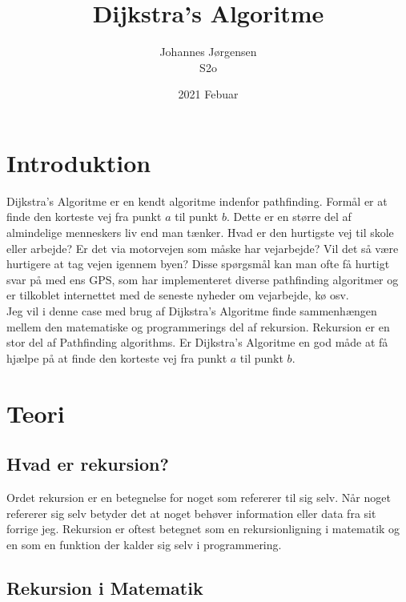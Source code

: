 \documentclass[12pt]{article}
\begin{document}
\title{Dijkstra's Algoritme}
\author{Johannes Jørgensen\\ S2o}
\date{2021 Febuar}
\maketitle
\pagebreak
\tableofcontents
\pagebreak

\section{Introduktion}
Dijkstra's Algoritme er en kendt algoritme indenfor pathfinding. Formål er at finde den korteste vej fra punkt $a$ til punkt $b$. Dette er en større del af almindelige menneskers liv end man tænker. Hvad er den hurtigste vej til skole eller arbejde? Er det via motorvejen som måske har vejarbejde? Vil det så være hurtigere at tag vejen igennem byen? Disse spørgsmål kan man ofte få hurtigt svar på med ens GPS, som har implementeret diverse pathfinding algoritmer og er tilkoblet internettet med de seneste nyheder om vejarbejde, kø osv. 
\\Jeg vil i denne case med brug af Dijkstra's Algoritme finde sammenhængen mellem den matematiske og programmerings del af rekursion. Rekursion er en stor del af Pathfinding algorithms. Er Dijkstra's Algoritme en god måde at få hjælpe på at finde den korteste vej fra punkt $a$ til punkt $b$.
\section{Teori}

\subsection{Hvad er rekursion?}
Ordet rekursion er en betegnelse for noget som refererer til sig selv. Når noget refererer sig selv betyder det at noget behøver information eller data fra sit forrige jeg. 
Rekursion er oftest betegnet som en rekursionligning i matematik og en som en funktion der kalder sig selv i programmering. 

\subsection{Rekursion i Matematik}
\end{document}

